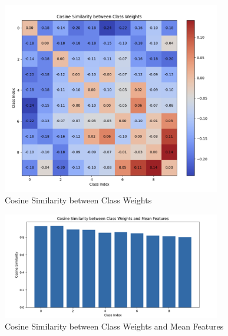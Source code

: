 \documentclass{article}
\begin{document}
\begin{figure}[h!]
\centering
\includegraphics[width=0.85\textwidth]{Plot/CE/cosine_similarity_between_class_weights.png}
\caption{Cosine Similarity between Class Weights}
\end{figure}
\hfill
\begin{figure}[h!]
\centering
\includegraphics[width=0.85\textwidth]{Plot/CE/cosine_similarity_between_class_weights_and_mean_features.png}
\caption{Cosine Similarity between Class Weights and Mean Features}
\end{figure}


\newpage
\end{document}
